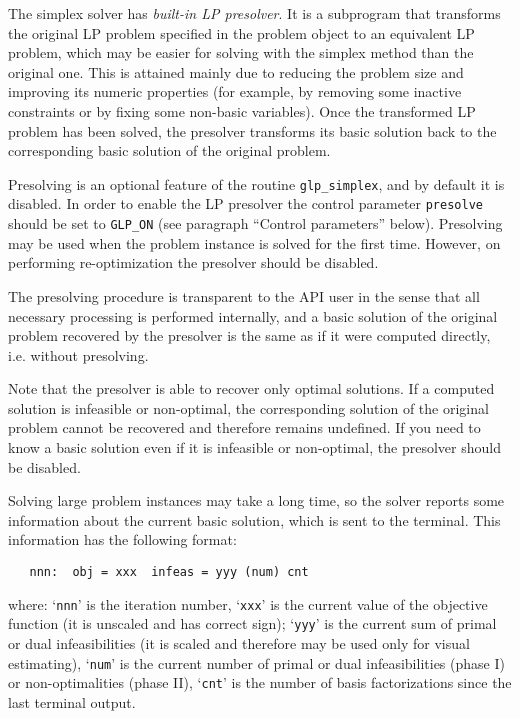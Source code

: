 
The simplex solver has {\it built-in LP presolver}. It is a subprogram
that transforms the original LP problem specified in the problem object
to an equivalent LP problem, which may be easier for solving with the
simplex method than the original one. This is attained mainly due to
reducing the problem size and improving its numeric properties (for
example, by removing some inactive constraints or by fixing some
non-basic variables). Once the transformed LP problem has been solved,
the presolver transforms its basic solution back to the corresponding
basic solution of the original problem.

Presolving is an optional feature of the routine \verb|glp_simplex|,
and by default it is disabled. In order to enable the LP presolver the
control parameter \verb|presolve| should be set to \verb|GLP_ON| (see
paragraph ``Control parameters'' below). Presolving may be used when
the problem instance is solved for the first time. However, on
performing re-optimization the presolver should be disabled.

The presolving procedure is transparent to the API user in the sense
that all necessary processing is performed internally, and a basic
solution of the original problem recovered by the presolver is the same
as if it were computed directly, i.e. without presolving.

Note that the presolver is able to recover only optimal solutions. If
a computed solution is infeasible or non-optimal, the corresponding
solution of the original problem cannot be recovered and therefore
remains undefined. If you need to know a basic solution even if it is
infeasible or non-optimal, the presolver should be disabled.


Solving large problem instances may take a long time, so the solver
reports some information about the current basic solution, which is
sent to the terminal. This information has the following format:

\begin{verbatim}
   nnn:  obj = xxx  infeas = yyy (num) cnt
\end{verbatim}

\noindent
where: `\verb|nnn|' is the iteration number, `\verb|xxx|' is the
current value of the objective function (it is unscaled and has correct
sign); `\verb|yyy|' is the current sum of primal or dual
infeasibilities (it is scaled and therefore may be used only for visual
estimating), `\verb|num|' is the current number of primal or dual
infeasibilities (phase I) or non-optimalities (phase II), `\verb|cnt|'
is the number of basis factorizations since the last terminal output.

